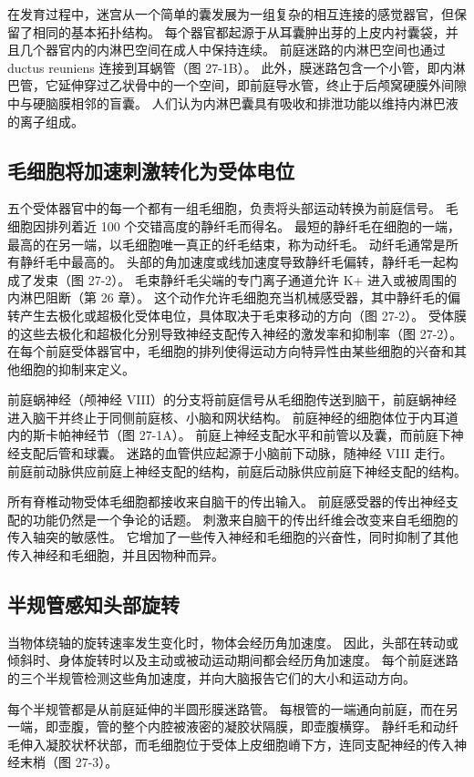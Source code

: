 在发育过程中，迷宫从一个简单的囊发展为一组复杂的相互连接的感觉器官，但保留了相同的基本拓扑结构。 每个器官都起源于从耳囊肿出芽的上皮内衬囊袋，并且几个器官内的内淋巴空间在成人中保持连续。 前庭迷路的内淋巴空间也通过 ductus reuniens 连接到耳蜗管（图 27-1B）。 此外，膜迷路包含一个小管，即内淋巴管，它延伸穿过乙状骨中的一个空间，即前庭导水管，终止于后颅窝硬膜外间隙中与硬脑膜相邻的盲囊。 人们认为内淋巴囊具有吸收和排泄功能以维持内淋巴液的离子组成。

\subsection{毛细胞将加速刺激转化为受体电位}
五个受体器官中的每一个都有一组毛细胞，负责将头部运动转换为前庭信号。 毛细胞因排列着近 100 个交错高度的静纤毛而得名。 最短的静纤毛在细胞的一端，最高的在另一端，以毛细胞唯一真正的纤毛结束，称为动纤毛。 动纤毛通常是所有静纤毛中最高的。 头部的角加速度或线加速度导致静纤毛偏转，静纤毛一起构成了发束（图 27-2）。 毛束静纤毛尖端的专门离子通道允许 K+ 进入或被周围的内淋巴阻断（第 26 章）。 这个动作允许毛细胞充当机械感受器，其中静纤毛的偏转产生去极化或超极化受体电位，具体取决于毛束移动的方向（图 27-2）。 受体膜的这些去极化和超极化分别导致神经支配传入神经的激发率和抑制率（图 27-2）。 在每个前庭受体器官中，毛细胞的排列使得运动方向特异性由某些细胞的兴奋和其他细胞的抑制来定义。

前庭蜗神经（颅神经 VIII）的分支将前庭信号从毛细胞传送到脑干，前庭蜗神经进入脑干并终止于同侧前庭核、小脑和网状结构。 前庭神经的细胞体位于内耳道内的斯卡帕神经节（图 27-1A）。 前庭上神经支配水平和前管以及囊，而前庭下神经支配后管和球囊。 迷路的血管供应起源于小脑前下动脉，随神经 VIII 走行。 前庭前动脉供应前庭上神经支配的结构，前庭后动脉供应前庭下神经支配的结构。

所有脊椎动物受体毛细胞都接收来自脑干的传出输入。 前庭感受器的传出神经支配的功能仍然是一个争论的话题。 刺激来自脑干的传出纤维会改变来自毛细胞的传入轴突的敏感性。 它增加了一些传入神经和毛细胞的兴奋性，同时抑制了其他传入神经和毛细胞，并且因物种而异。

\subsection{半规管感知头部旋转}
当物体绕轴的旋转速率发生变化时，物体会经历角加速度。 因此，头部在转动或倾斜时、身体旋转时以及主动或被动运动期间都会经历角加速度。 每个前庭迷路的三个半规管检测这些角加速度，并向大脑报告它们的大小和运动方向。

每个半规管都是从前庭延伸的半圆形膜迷路管。 每根管的一端通向前庭，而在另一端，即壶腹，管的整个内腔被液密的凝胶状隔膜，即壶腹横穿。 静纤毛和动纤毛伸入凝胶状杯状部，而毛细胞位于受体上皮细胞嵴下方，连同支配神经的传入神经末梢（图 27-3）。

